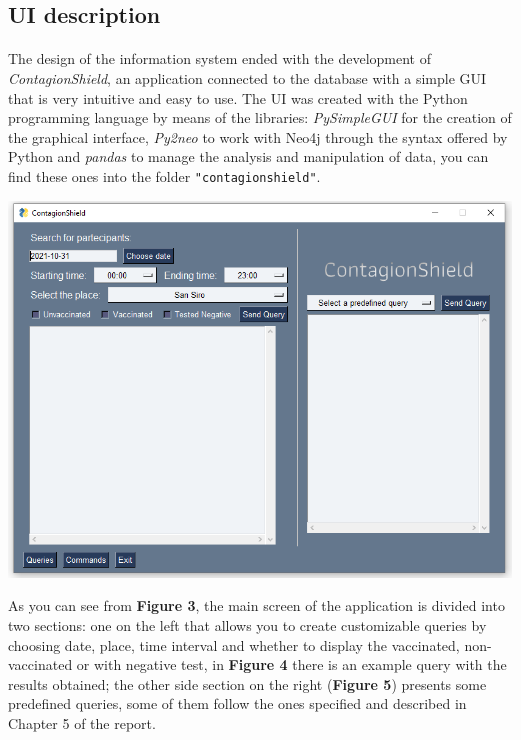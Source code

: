 \documentclass[a4paper,12pt]{article}
\begin{document}
\subsection{UI description}
\paragraph{}The design of the information system ended with the development of \emph{ContagionShield}, an application connected to the database with a simple GUI that is very intuitive and easy to use. The UI was created with the Python programming language by means of the libraries: \emph{PySimpleGUI} for the creation of the graphical interface, \emph{Py2neo} to work with Neo4j through the syntax offered by Python and \emph{pandas} to manage the analysis and manipulation of data, you can find these ones into the folder \texttt{"contagionshield"}. \par
	\begin{center}
 		\includegraphics[width = 11 cm]{queriespage.PNG}
	\end{center}
As you can see from \textbf{Figure 3}, the main screen of the application is divided into two sections: one on the left that allows you to create customizable queries by choosing date, place, time interval and whether to display the vaccinated, non-vaccinated or with negative test, in \textbf{Figure 4} there is an example query with the results obtained; the other side section on the right (\textbf{Figure 5}) presents some predefined queries, some of them follow the ones specified and described in Chapter 5 of the report. \par
\end{document}

